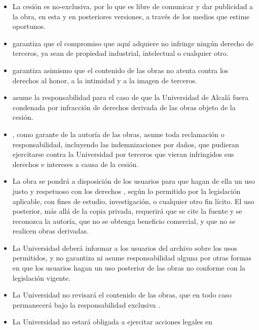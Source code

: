 \begin{itemize}
\item La cesión es no-exclusiva, por lo que \mybookAutorElOrLa{}
  \mybookAutorOrAutora{} es libre de comunicar y dar publicidad a la
  obra, en esta y en posteriores versiones, a través de los medios que
  estime oportunos.
\item \expandafter\makefirstuc\expandafter{\mybookAutorElOrLa}
  \mybookAutorOrAutora{} garantiza que el compromiso que aquí adquiere
  no infringe ningún derecho de terceros, ya sean de propiedad
  industrial, intelectual o cualquier otro.
\item \expandafter\makefirstuc\expandafter{\mybookAutorElOrLa}
  \mybookAutorOrAutora{}  garantiza asimismo que el contenido de las obras no atenta contra los derechos
  al honor, a la intimidad y a la imagen de terceros.
\item \expandafter\makefirstuc\expandafter{\mybookAutorElOrLa}
  \mybookAutorOrAutora{} asume la responsabilidad para el caso de que la Universidad de Alcalá fuera
  condenada por infracción de derechos derivada de las obras objeto de la cesión.
\item \expandafter\makefirstuc\expandafter{\mybookAutorElOrLa}
  \mybookAutorOrAutora{}, como garante de la autoría de las obras, asume toda reclamación o
  responsabilidad, incluyendo las indemnizaciones por daños, que pudieran ejercitarse
  contra la Universidad por terceros que vieran infringidos sus derechos e intereses a causa
  de la cesión.
\item La obra se pondrá a disposición de los usuarios para que hagan de
  ella un uso justo y respetuoso con los derechos \mybookAutorDelOrDeLa{}
  \mybookAutorOrAutora{}, según lo permitido por la legislación
  aplicable, con fines de estudio, investigación, o cualquier otro fin
  lícito. El uso posterior, más allá de la copia privada, requerirá que
  se cite la fuente y se reconozca la autoría, que no se obtenga
  beneficio comercial, y que no se realicen obras derivadas.
\item La Universidad deberá informar a los usuarios del archivo sobre los usos permitidos, y no
  garantiza ni asume responsabilidad alguna por otras formas en que los usuarios hagan un
  uso posterior de las obras no conforme con la legislación vigente.
\item La Universidad no revisará el contenido de las obras, que en todo
  caso permanecerá bajo la responsabilidad exclusiva \mybookAutorDelOrDeLa{}
  \mybookAutorOrAutora{}.
\item La Universidad no estará obligada a ejercitar acciones legales en

\end{itemize}
